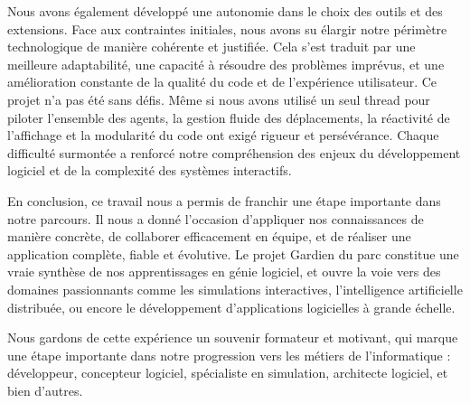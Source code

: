 Nous avons également développé une autonomie dans le choix des outils et des extensions. Face aux contraintes initiales, nous avons su élargir notre périmètre technologique de manière cohérente et justifiée. Cela s’est traduit par une meilleure adaptabilité, une capacité à résoudre des problèmes imprévus, et une amélioration constante de la qualité du code et de l’expérience utilisateur.
Ce projet n’a pas été sans défis. Même si nous avons utilisé un seul thread pour piloter l’ensemble des agents, la gestion fluide des déplacements, la réactivité de l’affichage et la modularité du code ont exigé rigueur et persévérance. Chaque difficulté surmontée a renforcé notre compréhension des enjeux du développement logiciel et de la complexité des systèmes interactifs.

En conclusion, ce travail nous a permis de franchir une étape importante dans notre parcours. Il nous a donné l’occasion d’appliquer nos connaissances de manière concrète, de collaborer efficacement en équipe, et de réaliser une application complète, fiable et évolutive. Le projet Gardien du parc constitue une vraie synthèse de nos apprentissages en génie logiciel, et ouvre la voie vers des domaines passionnants comme les simulations interactives, l'intelligence artificielle distribuée, ou encore le développement d'applications logicielles à grande échelle.

Nous gardons de cette expérience un souvenir formateur et motivant, qui marque une étape importante dans notre progression vers les métiers de l'informatique : développeur, concepteur logiciel, spécialiste en simulation, architecte logiciel, et bien d'autres.




